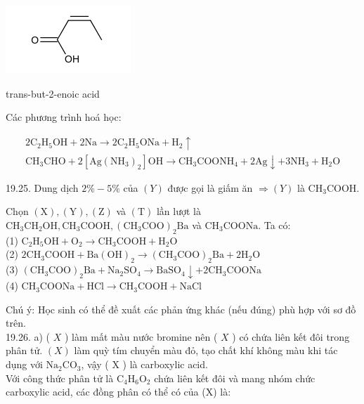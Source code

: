 \documentclass[10pt]{article}
\begin{document}
\includegraphics{smile-0a9a9af287f8f3ee2a33c8dc6a71a61103e90cbe}

trans-but-2-enoic acid

Các phương trình hoá học:

$$
\begin{gathered}
2 \mathrm{C}_{2} \mathrm{H}_{5} \mathrm{OH}+2 \mathrm{Na} \rightarrow 2 \mathrm{C}_{2} \mathrm{H}_{5} \mathrm{ONa}+\mathrm{H}_{2} \uparrow \\
\mathrm{CH}_{3} \mathrm{CHO}+2\left[\mathrm{Ag}\left(\mathrm{NH}_{3}\right)_{2}\right] \mathrm{OH} \rightarrow \mathrm{CH}_{3} \mathrm{COONH}_{4}+2 \mathrm{Ag} \downarrow+3 \mathrm{NH}_{3}+\mathrm{H}_{2} \mathrm{O}
\end{gathered}
$$

19.25. Dung dịch $2 \%-5 \%$ của $(Y)$ được gọi là giấm ăn $\Rightarrow(Y)$ là $\mathrm{CH}_{3} \mathrm{COOH}$.

Chọn $(\mathrm{X}),(\mathrm{Y}),(\mathrm{Z})$ và $(\mathrm{T})$ lần lượt là $\mathrm{CH}_{3} \mathrm{CH}_{2} \mathrm{OH}, \mathrm{CH}_{3} \mathrm{COOH},\left(\mathrm{CH}_{3} \mathrm{COO}\right)_{2} \mathrm{Ba}$ và $\mathrm{CH}_{3} \mathrm{COONa}$. Ta có:\\
(1) $\mathrm{C}_{2} \mathrm{H}_{5} \mathrm{OH}+\mathrm{O}_{2} \rightarrow \mathrm{CH}_{3} \mathrm{COOH}+\mathrm{H}_{2} \mathrm{O}$\\
(2) $2 \mathrm{CH}_{3} \mathrm{COOH}+\mathrm{Ba}(\mathrm{OH})_{2} \rightarrow\left(\mathrm{CH}_{3} \mathrm{COO}\right)_{2} \mathrm{Ba}+2 \mathrm{H}_{2} \mathrm{O}$\\
(3) $\left(\mathrm{CH}_{3} \mathrm{COO}\right)_{2} \mathrm{Ba}+\mathrm{Na}_{2} \mathrm{SO}_{4} \rightarrow \mathrm{BaSO}_{4} \downarrow+2 \mathrm{CH}_{3} \mathrm{COONa}$\\
(4) $\mathrm{CH}_{3} \mathrm{COONa}+\mathrm{HCl} \rightarrow \mathrm{CH}_{3} \mathrm{COOH}+\mathrm{NaCl}$

Chú ý: Học sinh có thể đề xuất các phản ứng khác (nếu đúng) phù hợp với sơ đồ trên.\\
19.26. a) ( $X$ ) làm mất màu nước bromine nên ( $X$ ) có chứa liên kết đôi trong phân tử. $(X)$ làm quỳ tím chuyển màu đỏ, tạo chất khí không màu khi tác dụng với $\mathrm{Na}_{2} \mathrm{CO}_{3}$, vậy ( X ) là carboxylic acid.\\
Với công thức phân tử là $\mathrm{C}_{4} \mathrm{H}_{6} \mathrm{O}_{2}$ chứa liên kết đôi và mang nhóm chức carboxylic acid, các đồng phân có thể có của (X) là:
\end{document}
